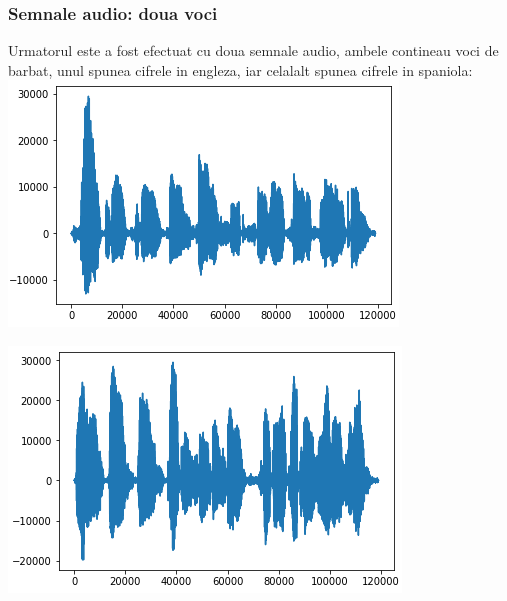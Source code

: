 \documentclass[12pt,oneside]{article}
\begin{document}
 \subsubsection{Semnale audio: doua voci}
 Urmatorul este a fost efectuat cu doua semnale audio, ambele contineau voci de barbat, unul spunea cifrele in engleza, iar celalalt spunea cifrele in spaniola:
	\includegraphics[scale=1]{english_speech}
\begin{center}
	\includegraphics[scale=1]{spanish_speech}
\end{center}
 
\end{document}
